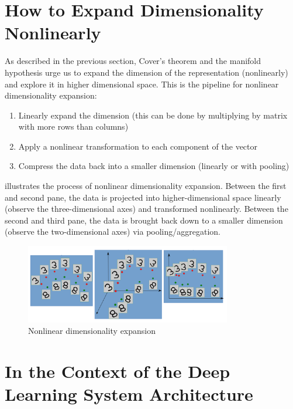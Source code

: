 \section{How to Expand Dimensionality Nonlinearly}\label{sec: expand_dim}

As described in the previous section, Cover's theorem and the manifold hypothesis urge us to expand the dimension of the representation (nonlinearly) and explore it in higher dimensional space.
This is the pipeline for nonlinear dimensionality expansion:
\begin{enumerate}
    \item Linearly expand the dimension (this can be done by multiplying by matrix with more rows than columns)
    \item Apply a nonlinear transformation to each component of the vector
    \item Compress the data back into a smaller dimension (linearly or with pooling) 
\end{enumerate}

 illustrates the process of nonlinear dimensionality expansion.
Between the first and second pane, the data is projected into higher-dimensional space linearly (observe the three-dimensional axes) and transformed nonlinearly.
Between the second and third pane, the data is brought back down to a smaller dimension (observe the two-dimensional axes) via pooling/aggregation.

\begin{figure}[ht]
\centering
\includegraphics[width=90mm]{lectures/01-b/nonlinear_expansion.png}
\caption{Nonlinear dimensionality expansion}
\label{fig:nonlinear_expansion}
\end{figure}

\section{In the Context of the Deep Learning System Architecture}

